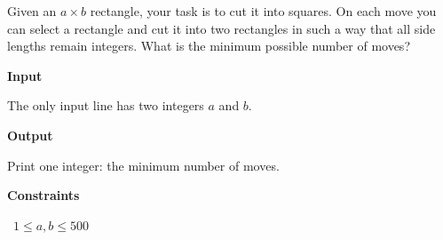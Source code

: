 Given an $a \times b$ rectangle, your task is to cut it into squares. On each move you can select a rectangle and cut it into two rectangles in such a way that all side lengths remain integers. What is the minimum possible number of moves?

\vspace{0.3cm}\noindent\textbf{Input}

The only input line has two integers $a$ and $b$.

\vspace{0.3cm}\noindent\textbf{Output}

Print one integer: the minimum number of moves.

\vspace{0.3cm}\noindent\textbf{Constraints}

\textbullet\ $1 \le a,b \le 500$
